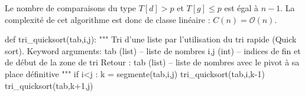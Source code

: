 \documentclass[10pt,fleqn]{article} %
\newcommand{\tsf}[1]{\small{\texttt{#1}}}
\begin{document}
\begin{resultat}
Le nombre de comparaisons du type $T[d]>p$ et $T[g]\leq p$ est égal à $n-1$.
La complexité de cet algorithme est donc de classe linéaire : $C(n)=\mathcal{O}(n)$.
\end{resultat}
%
\begin{py}
\begin{python}
def tri_quicksort(tab,i,j):
    """
    Tri d'une liste par l'utilisation du tri rapide (Quick sort).
    Keyword arguments: 
      tab (list) -- liste de nombres
      i,j (int) -- indices de fin et de début de la zone de tri
    Retour :    
      tab (list) -- liste de nombres avec 
    le pivot à sa place définitive
    """
    if i<j :
        k = segmente(tab,i,j)
        tri_quicksort(tab,i,k-1)
        tri_quicksort(tab,k+1,j)
\end{python}
\end{py}
\end{document}
